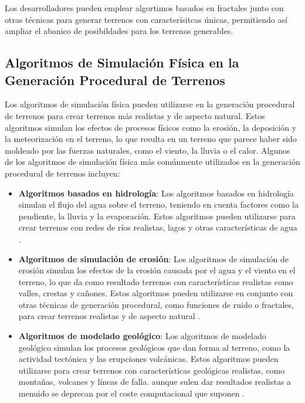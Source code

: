 Los desarrolladores pueden emplear algortimos basados en fractales junto con otras técnicas para generar terrenos con caracterísitcas únicas, permitiendo así ampliar el abanico de posibildades para los terrenos generables.

\subsection{Algoritmos de Simulación Física en la Generación Procedural de Terrenos}

Los algoritmos de simulación física pueden utilizarse en la generación procedural de terrenos para crear terrenos más realistas y de aspecto natural. Estos algoritmos simulan los efectos de procesos físicos como la erosión, la deposición y la meteorización en el terreno, lo que resulta en un terreno que parece haber sido moldeado por las fuerzas naturales, como el viento, la lluvia o el calor. Algunos de los algoritmos de simulación física más comúnmente utilizados en la generación procedural de terrenos incluyen:

\begin{itemize}
    \item \textbf{Algoritmos basados en hidrología}: Los algoritmos basados en hidrología simulan el flujo del agua sobre el terreno, teniendo en cuenta factores como la pendiente, la lluvia y la evaporación. Estos algoritmos pueden utilizarse para crear terrenos con redes de ríos realistas, lagos y otras características de agua \cite{AlgoritmosHidrologia} \cite{HidrologiaDocumento}.
    
    \item \textbf{Algoritmos de simulación de erosión}: Los algoritmos de simulación de erosión simulan los efectos de la erosión causada por el agua y el viento en el terreno, lo que da como resultado terrenos con características realistas como valles, crestas y cañones. Estos algoritmos pueden utilizarse en conjunto con otras técnicas de generación procedural, como funciones de ruido o fractales, para crear terrenos realistas y de aspecto natural \cite{AlgoritmosErosion} \cite{ErosionReddit}.
    
    \item \textbf{Algoritmos de modelado geológico}: Los algoritmos de modelado geológico simulan los procesos geológicos que dan forma al terreno, como la actividad tectónica y las erupciones volcánicas. Estos algoritmos pueden utilizarse para crear terrenos con características geológicas realistas, como montañas, volcanes y líneas de falla. aunque sulen dar resultados realistas a menuido se deprecan por el coste computacional que suponen \cite{GeologiaDocumento}.
\end{itemize}

